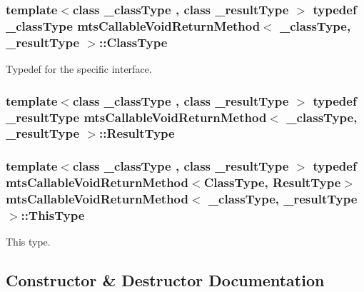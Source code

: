 \subsubsection[{Class\+Type}]{\setlength{\rightskip}{0pt plus 5cm}template$<$class \+\_\+class\+Type , class \+\_\+result\+Type $>$ typedef \+\_\+class\+Type {\bf mts\+Callable\+Void\+Return\+Method}$<$ \+\_\+class\+Type, \+\_\+result\+Type $>$\+::{\bf Class\+Type}}\label{classmts_callable_void_return_method_a2bea77e5dd239ec2a1d3558dd3ca1776}
Typedef for the specific interface. \hypertarget{classmts_callable_void_return_method_af01afd5ee66910d12e6fc9703a976260}{}
\subsubsection[{Result\+Type}]{\setlength{\rightskip}{0pt plus 5cm}template$<$class \+\_\+class\+Type , class \+\_\+result\+Type $>$ typedef \+\_\+result\+Type {\bf mts\+Callable\+Void\+Return\+Method}$<$ \+\_\+class\+Type, \+\_\+result\+Type $>$\+::{\bf Result\+Type}}\label{classmts_callable_void_return_method_af01afd5ee66910d12e6fc9703a976260}
\hypertarget{classmts_callable_void_return_method_a03bdd60bba7b2b001dd94270d8a27a5f}{}
\subsubsection[{This\+Type}]{\setlength{\rightskip}{0pt plus 5cm}template$<$class \+\_\+class\+Type , class \+\_\+result\+Type $>$ typedef {\bf mts\+Callable\+Void\+Return\+Method}$<${\bf Class\+Type}, {\bf Result\+Type}$>$ {\bf mts\+Callable\+Void\+Return\+Method}$<$ \+\_\+class\+Type, \+\_\+result\+Type $>$\+::{\bf This\+Type}}\label{classmts_callable_void_return_method_a03bdd60bba7b2b001dd94270d8a27a5f}
This type. 

\subsection{Constructor \& Destructor Documentation}
\hypertarget{classmts_callable_void_return_method_a98d4891da35626a8e9f924c98c75fa7b}{}
